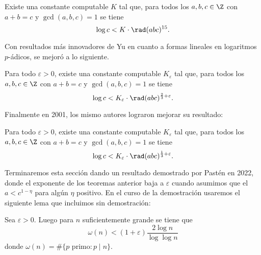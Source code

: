 \documentclass[11pt, reqno]{amsart}
\begin{document}
\begin{thm}
	Existe una constante computable $K$ tal que, para todos los $a,b,c\in \Z$ con $a+b=c$ y $\gcd(a,b,c)=1$ se tiene $$\log c< K\cdot \rad(abc)^{15}.$$
\end{thm}

Con resultados más innovadores de Yu en cuanto a formas lineales en logaritmos $p$-ádicos, se mejoró a lo siguiente.

\begin{thm}[Stewart-Yu,1991]
	Para todo $\varepsilon>0$, existe una constante computable $K_{\varepsilon}$ tal que, para todos los $a,b,c\in \Z$ con $a+b=c$ y $\gcd(a,b,c)=1$ se tiene $$\log c< K_{\varepsilon}\cdot \rad(abc)^{\frac{2}{3}+\varepsilon}.$$   
\end{thm}

Finalmente en 2001, los mismo autores lograron mejorar su resultado:

\begin{thm}[Stewart-Yu, 2001]
	Para todo $\varepsilon>0$, existe una constante computable $K_{\varepsilon}$ tal que, para todos los $a,b,c\in \Z$ con $a+b=c$ y $\gcd(a,b,c)=1$ se tiene
	\[
		\log c< K_{\varepsilon}\cdot \rad(abc)^{\frac{1}{3}+\varepsilon}.
	\]
\end{thm}

Terminaremos esta sección dando un resultado demostrado por Pastén en 2022, donde el exponente de los teoremas anterior baja a $\varepsilon$ cuando asumimos que el $a<c^{1-\eta}$ para algún $\eta$ positivo. En el curso de la demostración usaremos el siguiente lema que incluimos sin demostración:

\begin{lem}
	Sea $\varepsilon>0$. Luego para $n$ suficientemente grande se tiene que $$\omega(n)<(1+\varepsilon)\frac{2\log n}{\log\log n}$$ donde $\omega(n)=\#\{p\text{ primo} : p\mid n\}$.
\end{lem}
\end{document}
